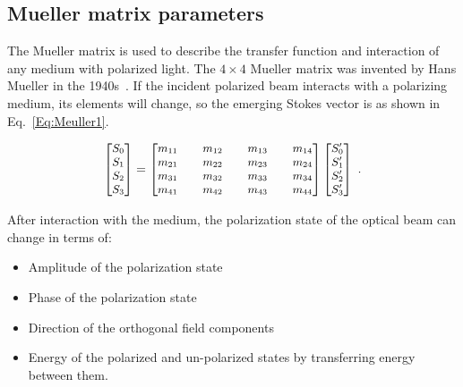 \subsection{Mueller matrix parameters}
\label{subsec:MuellerMeasurement}
The Mueller matrix is used to describe the transfer function and interaction of any medium with polarized light.
The $4 \times 4$ Mueller matrix was invented by Hans Mueller in the 1940s~\cite{goldstein2003polarized}.
If the incident polarized beam interacts with a polarizing medium, its elements will change, so the emerging Stokes vector is as shown in Eq.~\ref{Eq:Meuller1}.

\begin{equation}\label{Eq:Meuller1}
\small
	\begin{bmatrix}
	S_{0}\\S_{1}\\S_{2}\\S_{3}
	\end{bmatrix} = 
	\begin{bmatrix}
	m_{11} & & m_{12} & & m_{13} & & m_{14}\\m_{21}& & m_{22}& & m_{23}& & m_{24}\\m_{31}& & m_{32}& & m_{33}& & m_{34}\\m_{41}& & m_{42}& & m_{43}& & m_{44}
	\end{bmatrix}
	\begin{bmatrix}
	S'_{0}\\S'_{1}\\S'_{2}\\S'_{3}
	\end{bmatrix}~.
\end{equation}

After interaction with the medium, the polarization state of the optical beam can change in terms of:
\begin{itemize}
\item Amplitude of the polarization state
\item Phase of the polarization state
\item Direction of the orthogonal field components
\item Energy of the polarized and un-polarized states by transferring energy between them. 
\end{itemize}

